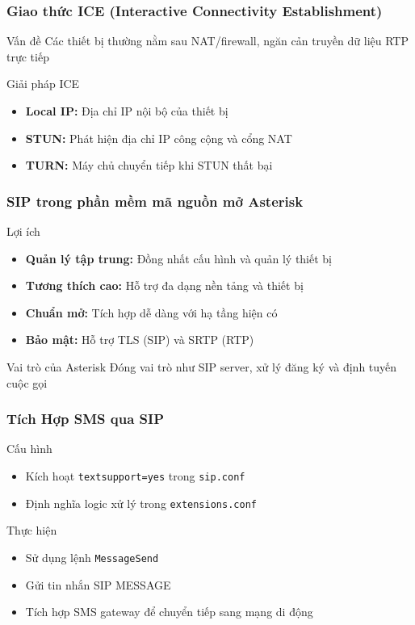 \begin{frame}
\frametitle{Giao thức ICE (Interactive Connectivity Establishment)}

\begin{block}{Vấn đề}
Các thiết bị thường nằm sau NAT/firewall, ngăn cản truyền dữ liệu RTP trực tiếp
\end{block}

\begin{block}{Giải pháp ICE}
\begin{itemize}
\item \textbf{Local IP:} Địa chỉ IP nội bộ của thiết bị
\item \textbf{STUN:} Phát hiện địa chỉ IP công cộng và cổng NAT
\item \textbf{TURN:} Máy chủ chuyển tiếp khi STUN thất bại
\end{itemize}
\end{block}

\end{frame}

\begin{frame}
\frametitle{SIP trong phần mềm mã nguồn mở Asterisk}

\begin{block}{Lợi ích}
\begin{itemize}
\item \textbf{Quản lý tập trung:} Đồng nhất cấu hình và quản lý thiết bị
\item \textbf{Tương thích cao:} Hỗ trợ đa dạng nền tảng và thiết bị
\item \textbf{Chuẩn mở:} Tích hợp dễ dàng với hạ tầng hiện có
\item \textbf{Bảo mật:} Hỗ trợ TLS (SIP) và SRTP (RTP)
\end{itemize}
\end{block}

\begin{block}{Vai trò của Asterisk}
Đóng vai trò như SIP server, xử lý đăng ký và định tuyến cuộc gọi
\end{block}

\end{frame}

\begin{frame}
\frametitle{Tích Hợp SMS qua SIP}
\begin{block}{Cấu hình}
\begin{itemize}
\item Kích hoạt \texttt{textsupport=yes} trong \texttt{sip.conf}
\item Định nghĩa logic xử lý trong \texttt{extensions.conf}
\end{itemize}
\end{block}

\begin{block}{Thực hiện}
\begin{itemize}
\item Sử dụng lệnh \texttt{MessageSend}
\item Gửi tin nhắn SIP MESSAGE
\item Tích hợp SMS gateway để chuyển tiếp sang mạng di động
\end{itemize}
\end{block}

\end{frame}

